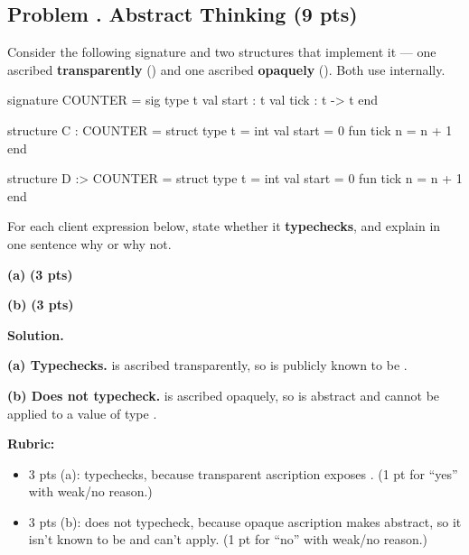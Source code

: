 \documentclass[crop=false]{standalone}
\newif\ifsol
\newenvironment{solution}
    {\par\color{solution_color}\begin{framed}\textbf{Solution.}\par}
    {\end{framed}}
\newcommand{\quizproblem}[3]{%
  \needspace{5\baselineskip}%
  \stepcounter{problem}%
  \ifsol
    \subsection*{Problem \arabic{problem}. #1 \hfill \timing{#2} \quad (#3 pts)}%
  \else
    \subsection*{Problem \arabic{problem}. #1 \hfill (#3 pts)}%
  \fi
}
\newcommand{\subpts}[1]{\textbf{(#1 pts)}}
\newcommand{\answerspace}[1]{\ifsol\else\vspace{#1}\par\fi}
\begin{document}

\quizproblem{Abstract Thinking}{8}{9}

Consider the following signature and two structures that implement it ---
one ascribed \textbf{transparently} (\code{:}) and one ascribed
\textbf{opaquely} (\code{:>}). Both use  internally.

\begin{codeblock}
  signature COUNTER =
    sig
      type t
      val start : t
      val tick  : t -> t
    end

  structure C : COUNTER =
    struct type t = int  val start = 0  fun tick n = n + 1 end

  structure D :> COUNTER =
    struct type t = int  val start = 0  fun tick n = n + 1 end
\end{codeblock}

For each client expression below, state whether it \textbf{typechecks}, and
explain in one sentence why or why not.

\vspace{0.5em}

\textbf{(a)} \subpts{3} 

\answerspace{2.5cm}

\textbf{(b)} \subpts{3} 

\answerspace{2.5cm}

\begin{solution}
\textbf{(a) Typechecks.}  is ascribed transparently, so
 is publicly known to be .

\textbf{(b) Does not typecheck.}  is ascribed opaquely,
so  is abstract and \code{+}
cannot be applied to a value of type .

\textbf{Rubric:}
\begin{itemize}
  \item 3 pts (a): typechecks, because transparent ascription exposes
    . (1 pt for ``yes'' with weak/no reason.)
  \item 3 pts (b): does not typecheck, because opaque ascription makes
     abstract, so it isn't known to be  and \code{+}
    can't apply. (1 pt for ``no'' with weak/no reason.)
\end{itemize}
\end{solution}
\end{document}
